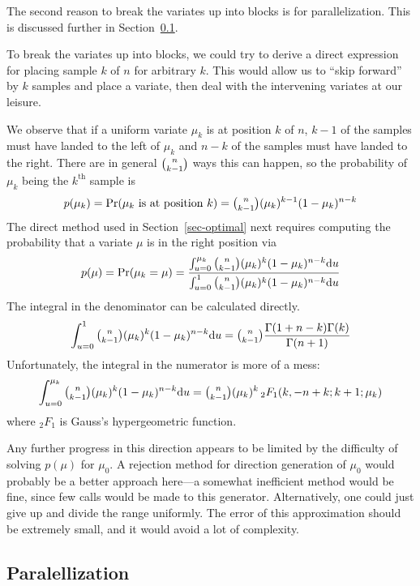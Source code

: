 \documentclass[12pt]{article}
\newcommand{\hyperg}{{{{}_2}{F_1}}}
\newcommand{\du}{{\text{d}u}}
\begin{document}
  The second reason to break the variates up into blocks is
  for parallelization.  This is discussed further in
  Section~\ref{sec-parallel}.

  To break the variates up into blocks, we could try to
  derive a direct expression for placing sample $k$ of $n$
  for arbitrary $k$.  This would allow us to ``skip forward''
  by $k$ samples and place a variate, then deal with the
  intervening variates at our leisure.

  We observe that if a uniform variate $\mu_k$ is at
  position $k$ of $n$, $k - 1$ of the samples must have landed to the
  left of $\mu_k$ and $n - k$ of the samples must have
  landed to the right.  There are in general $\tbinom{n}{k-1}$
  ways this can happen, so the probability of $\mu_k$ being
  the $k^{\text{th}}$ sample is $$
    p(\mu_k) = \text{Pr}(\mu_k\text{ is at position }k) =
         \tbinom{n}{k - 1}(\mu_k)^{k-1}(1-\mu_k)^{n - k}
  $$
  The direct method used in Section~\ref{sec-optimal}
  next requires computing the probability that a variate
  $\mu$ is in the right position via $$
    p(\mu) = \text{Pr}(\mu_k = \mu) =
      \frac{\int_{u=0}^{\mu_k}{\tbinom{n}{k - 1}(\mu_k)^k(1-\mu_k)^{n - k}}\du}
           {\int_{u=0}^{1}{\tbinom{n}{k - 1}(\mu_k)^k(1-\mu_k)^{n - k}}\du}
  $$
  The integral in the denominator can be calculated
  directly. $$
    \int_{u=0}^{1}{\tbinom{n}{k - 1}(\mu_k)^k(1-\mu_k)^{n - k}}\du = 
        \tbinom{n}{k - 1}\frac{\Gamma(1 + n - k)\Gamma(k)}{\Gamma(n + 1)}
  $$
  Unfortunately, the integral in the numerator is more of a
  mess: $$
    \int_{u=0}^{\mu_k}{\tbinom{n}{k - 1}(\mu_k)^k(1-\mu_k)^{n - k}}\du =
        \tbinom{n}{k - 1}(\mu_k)^k\,\hyperg(k, -n + k; k + 1; \mu_k)
  $$
  where $\hyperg$ is Gauss's hypergeometric function.

  Any further progress in this direction appears to be
  limited by the difficulty of solving $p(\mu)$
  for $\mu_0$.  A rejection method for direction generation
  of $\mu_0$ would probably be a better approach here---a
  somewhat inefficient method would be fine, since few calls
  would be made to this generator.  Alternatively, one could
  just give up and divide the range uniformly.  The error of
  this approximation should be extremely small, and it would
  avoid a lot of complexity.
  
\subsection{Paralellization}\label{sec-parallel}
\end{document}

